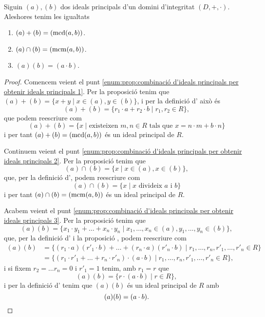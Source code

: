 \documentclass[../Apunts.tex]{subfiles}
\begin{document}
	\begin{proposition}
		\label{prop:combinació d'ideals principals per obtenir ideals principals}
		Siguin \((a),(b)\) dos ideals principals d'un domini d'integritat \((D,+,\cdot)\). Aleshores tenim les igualtats
		\begin{enumerate}
			\item\label{enum:prop:combinació d'ideals principals per obtenir ideals principals 1} \((a)+(b)=(\operatorname{mcd}(a,b))\).
			\item\label{enum:prop:combinació d'ideals principals per obtenir ideals principals 2} \((a)\cap(b)=(\operatorname{mcm}(a,b))\).
			\item\label{enum:prop:combinació d'ideals principals per obtenir ideals principals 3} \((a)(b)=(a\cdot b)\).
		\end{enumerate}
		\begin{proof}%
			Comencem veient el punt \eqref{enum:prop:combinació d'ideals principals per obtenir ideals principals 1}. Per la proposició  tenim que \((a)+(b)=\{x+y\mid x\in(a),y\in(b)\}\), i per la definició d' això és
			\[(a)+(b)=\{r_{1}\cdot a+r_{2}\cdot b\mid r_{1},r_{2}\in R\},\]
			que podem reescriure com
			\[(a)+(b)=\{x\mid\text{existeixen }m,n\in R\text{ tals que }x=n\cdot m+b\cdot n\}\]
			i per tant \((a)+(b)=(\operatorname{mcd}(a,b))\) és un ideal principal de \(R\). %
			
			Continuem veient el punt \eqref{enum:prop:combinació d'ideals principals per obtenir ideals principals 2}. Per la proposició  tenim que
			\[(a)\cap(b)=\{x\mid x\in(a),x\in(b)\},\]
			que, per la definició d', podem reescriure com
			\[(a)\cap(b)=\{x\mid x\text{ divideix }a\text{ i }b\}\]
			i per tant \((a)\cap(b)=(\operatorname{mcm}(a,b))\) és un ideal principal de \(R\). %
			
			Acabem veient el punt \eqref{enum:prop:combinació d'ideals principals per obtenir ideals principals 3}. Per la proposició  tenim que
			\[(a)(b)=\{x_{1}\cdot y_{1}+\dots+x_{n}\cdot y_{n}\mid x_{1},\dots,x_{n}\in(a),y_{1},\dots,y_{n}\in(b)\},\]
			que, per la definició d' i la proposició , podem reescriure com
			\begin{align*}
			(a)(b)&=\{(r_{1}\cdot a)(r'_{1}\cdot b)+\dots+(r_{n}\cdot a)(r'_{n}\cdot b)\mid r_{1},\dots,r_{n},r'_{1},\dots,r'_{n}\in R\}\\
			&=\{(r_{1}\cdot r'_{1}+\dots+r_{n}\cdot r'_{n})\cdot(a\cdot b)\mid r_{1},\dots,r_{n},r'_{1},\dots,r'_{n}\in R\},
			\end{align*}
			i si fixem \(r_{2}=\dots r_{n}=0\) i \(r'_{1}=1\) tenim, amb \(r_{1}=r\) que
			\[(a)(b)=\{r\cdot(a\cdot b)\mid r\in R\},\]
			i per la definició d' tenim que \((a)(b)\) és un ideal principal de \(R\) amb
			\[(a)(b)=(a\cdot b).\qedhere\]
		\end{proof}
	\end{proposition}
\end{document}
